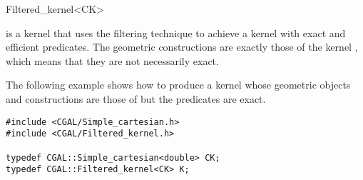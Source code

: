 
\begin{ccRefClass}{Filtered_kernel<CK>}


\KernelRefLayout\gdef\ccTagOperatorLayout{\ccFalse}

\ccDefinition

\ccClassTemplateName is a kernel that uses the filtering technique
\cite{bbp-iayed-01} to achieve a kernel with exact and efficient
predicates.
The geometric constructions are exactly those
of the kernel , which means that they are not necessarily exact.







\ccExample

The following example shows how to produce a kernel whose geometric
objects and constructions are those of 
but the predicates are exact. 

\begin{verbatim}
#include <CGAL/Simple_cartesian.h>
#include <CGAL/Filtered_kernel.h>

typedef CGAL::Simple_cartesian<double> CK;
typedef CGAL::Filtered_kernel<CK> K;

\end{verbatim}


\end{ccRefClass}
